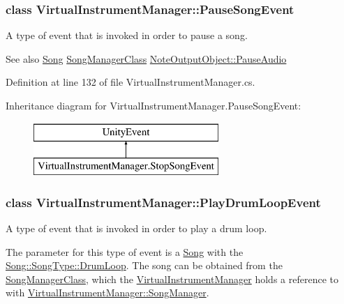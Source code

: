 \subsubsection{class Virtual\+Instrument\+Manager\+:\+:Pause\+Song\+Event}
A type of event that is invoked in order to pause a song. 

\begin{DoxySeeAlso}{See also}
\hyperlink{class_song}{Song} \hyperlink{class_song_manager_class}{Song\+Manager\+Class} \hyperlink{group___n_o_o_pub_func_ga7977bc941f355866c7e4c141a8f7b8bb}{Note\+Output\+Object\+::\+Pause\+Audio} 
\end{DoxySeeAlso}


Definition at line 132 of file Virtual\+Instrument\+Manager.\+cs.

Inheritance diagram for Virtual\+Instrument\+Manager.\+Pause\+Song\+Event\+:\begin{figure}[H]
\begin{center}
\leavevmode
\includegraphics[height=2.000000cm]{group___v_i_m_event_types}
\end{center}
\end{figure}
\label{class_virtual_instrument_manager_1_1_play_drum_loop_event}
\subsubsection{class Virtual\+Instrument\+Manager\+:\+:Play\+Drum\+Loop\+Event}
A type of event that is invoked in order to play a drum loop. 

The parameter for this type of event is a \hyperlink{class_song}{Song} with the \hyperlink{group___song_enums_ggae681a1f001333e39fc1cb4fea97bfe1ba150deef06b13ddaeac61d0d2699ec61e}{Song\+::\+Song\+Type\+::\+Drum\+Loop}. The song can be obtained from the \hyperlink{class_song_manager_class}{Song\+Manager\+Class}, which the \hyperlink{class_virtual_instrument_manager}{Virtual\+Instrument\+Manager} holds a reference to with \hyperlink{group___v_i_m_pub_ga33dae94932c10c66db76a0eebec76b01}{Virtual\+Instrument\+Manager\+::\+Song\+Manager}.

